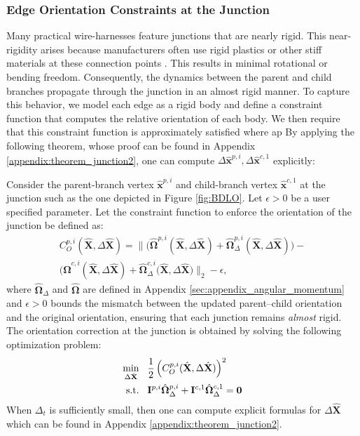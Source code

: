 \subsubsection{Edge Orientation Constraints at the Junction}
Many practical wire-harnesses feature junctions that are nearly rigid. 
This near-rigidity arises because manufacturers often use rigid plastics or other stiff materials at these connection points \cite{wireharnesinstruction}.
This results in minimal rotational or bending freedom. 
Consequently, the dynamics between the parent and child branches propagate through the junction in an almost rigid manner.
To capture this behavior, we model each edge as a rigid body and define a constraint function that computes the relative orientation of each body.
We then require that this constraint function is approximately satisfied where ap
By applying the following theorem, whose proof can be found in Appendix \ref{appendix:theorem_junction2}, one can compute $\Delta \hat{\mathbf{x}}^{p,i}, \Delta \hat{\mathbf{x}}^{c,1}$ explicitly:
\begin{thm}
    \label{thm:junctionconstraint}
    Consider the parent-branch vertex $\hat{\mathbf{x}}^{p,i}$ and child-branch vertex $\hat{\mathbf{x}}^{c,1}$ at the junction such as the one depicted in Figure \ref{fig:BDLO}.
    Let $\epsilon > 0$ be a user specified parameter. 
    Let the constraint function to enforce the orientation of the junction be defined as:
    \begin{multline}
    \label{eq:constraints_orietation}
     C^{p,i}_O(\hat{\mathbf{X}}, \Delta \hat{\mathbf{X}}) =  \|\big(\hat{\boldsymbol{\Omega}}^{p, i}(\hat{\mathbf{X}}, \Delta \hat{\mathbf{X}})  + \hat{\boldsymbol{\Omega}}_{\Delta}^{p, i}(\hat{\mathbf{X}}, \Delta \hat{\mathbf{X}}) \big)
    - \\  \big( \hat{\boldsymbol{\Omega}}^{c, i}(\hat{\mathbf{X}}, \Delta \hat{\mathbf{X}}) + \hat{\boldsymbol{\Omega}}_{\Delta}^{c, i}(\hat{\mathbf{X}}, \Delta \hat{\mathbf{X}}\big) \|_2 - \epsilon,
    \end{multline}
    where $\hat{\boldsymbol{\Omega}}_{\Delta}$ and $\hat{\boldsymbol{\Omega}}$ are defined in Appendix \ref{sec:appendix_angular_momentum} and \(\epsilon > 0\) bounds the mismatch between the updated parent--child orientation and the original orientation, ensuring that each junction remains \emph{almost} rigid. 
    The orientation correction at the junction is obtained by solving the following optimization problem:
\begin{align}
    &&  
    \underset{\Delta \hat{\mathbf{X}}}{\min} & \hspace{0.3cm}
    \frac{1}{2}\left(C^{p,i}_O(\hat{\mathbf{X}}, \Delta \hat{\mathbf{X}})\right)^2 &
    \label{eq:constraint_rigid_body}\\
    &&  \text{s.t.} &  \hspace{0.3cm} 
    \mathbf{I}^{p, i} \hat{\boldsymbol{\Omega}}_{\Delta}^{p, i}  + \mathbf{I}^{c, 1} \hat{\boldsymbol{\Omega}}_{\Delta}^{c, 1}  = \mathbf{0} \notag &
\end{align}
When $\Delta_t$ is sufficiently small, then one can compute explicit formulas for $\Delta \hat{\mathbf{X}}$ which can be found in Appendix \ref{appendix:theorem_junction2}.
\end{thm}
